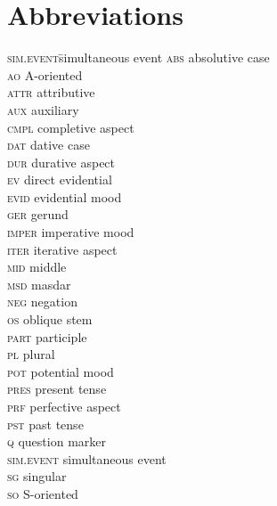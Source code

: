 \documentclass[output=paper]{langscibook}
\begin{document}
\section*{Abbreviations}
\begin{multicols}{2}
\begin{tabbing}
\textsc{sim.event}\hspace{1ex}\= simultaneous event\kill
\textsc{abs} \> absolutive case\\
\textsc{ao} \> A-oriented\\
\textsc{attr} \> attributive\\
\textsc{aux} \> auxiliary\\
\textsc{cmpl} \> completive aspect\\
\textsc{dat} \> dative case\\
\textsc{dur} \> durative aspect\\
\textsc{ev} \> direct evidential\\
\textsc{evid} \> evidential mood\\
\textsc{ger} \> gerund\\
\textsc{imper} \> imperative mood\\
\textsc{iter} \> iterative aspect\\
\textsc{mid} \> middle\\
\textsc{msd} \> masdar\\
\textsc{neg} \> negation\\
\textsc{os} \> oblique stem\\
\textsc{part} \> participle\\
\textsc{pl} \> plural\\
\textsc{pot} \> potential mood\\
\textsc{pres} \> present tense\\
\textsc{prf} \> perfective aspect\\
\textsc{pst} \>  past tense\\
\textsc{q} \> question marker\\
\textsc{sim.event} \> simultaneous event\\
\textsc{sg}\> singular\\
\textsc{so}\> S-oriented
\end{tabbing}
\end{multicols}


{\sloppy\printbibliography[heading=subbibliography,notkeyword=this]}
\end{document}
